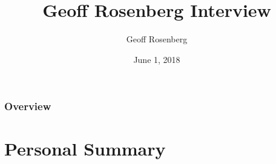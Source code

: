 \documentclass[aspectratio=169]{beamer}
\title[Summary Presentation]{Geoff Rosenberg Interview} %
\author{Geoff Rosenberg} %
\institute[] %
{
\textit{Geoff.Rosenberg@gmail.com} %
}
\date{June 1, 2018} %
\begin{document}
\begin{frame}
\titlepage %
\end{frame}

\begin{frame}
\frametitle{Overview} %
\tableofcontents %
\end{frame}


\section{Personal Summary} %


\end{document}
